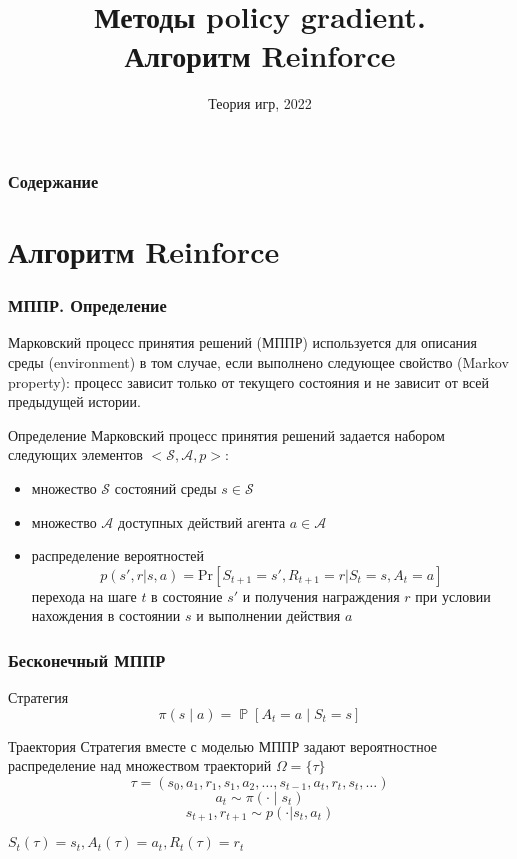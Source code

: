 \documentclass[notheorems]{beamer} %
\title[Обучение с подкреплением] %
{Методы policy gradient. \\
Алгоритм Reinforce}
\date[Теория игр] %
{Теория игр,  2022}
\begin{document}
\frame{\titlepage}


\begin{frame}
\frametitle{Содержание}%
\tableofcontents
\end{frame}
\section{Алгоритм Reinforce}
\begin{frame}
	\frametitle{МППР. Определение}
	Марковский процесс принятия решений (МППР) используется для описания среды (environment)  в том случае, если выполнено следующее свойство (Markov property): процесс зависит только от текущего состояния и не зависит от всей предыдущей истории.
	
	\begin{block}{ Определение}
		Марковский процесс принятия решений задается набором следующих элементов $<\mathcal{S}, \mathcal{A}, p>$:
		\begin{itemize}
			\item множество  $\mathcal{S}$  состояний среды $s \in \mathcal{S}$
			\item множество $\mathcal{A}$ доступных действий агента $a \in \mathcal{A}$
			\item распределение вероятностей
			$$p(s',r|s,a)=\text{Pr}[S_{t+1}=s', R_{t+1}=r|S_t=s, A_t=a ]$$ перехода на шаге $t$  в состояние $s'$ и получения награждения  $r$ при условии нахождения в состоянии $s$ и выполнении действия $a$ 
		\end{itemize}
	\end{block}
\end{frame}
\begin{frame}
	\frametitle{Бесконечный МППР}
	\begin{block}{Стратегия}
		$$\pi ( s \mid a) = \mathop{\mathbb{P}}[A_t=a \mid S_t=s] $$
	\end{block}
	\begin{block}{Траектория}
		Стратегия вместе с моделью МППР задают вероятностное распределение над множеством траекторий $\Omega=\{\tau\}$
		$$\tau = (s_0, a_1, r_1, s_1, a_2, \dots, s_{t-1}, a_{t}, r_{t}, s_t, \dots)$$
		$$a_t \sim \pi(\cdot \mid s_t)$$ $$s_{t+1},r_{t+1} \sim p(\cdot|s_t, a_t)$$
	\end{block}
	
	$S_t(\tau) = s_t, A_t(\tau) = a_t,R_t(\tau) = r_t$
	

	
\end{frame}
\end{document}
